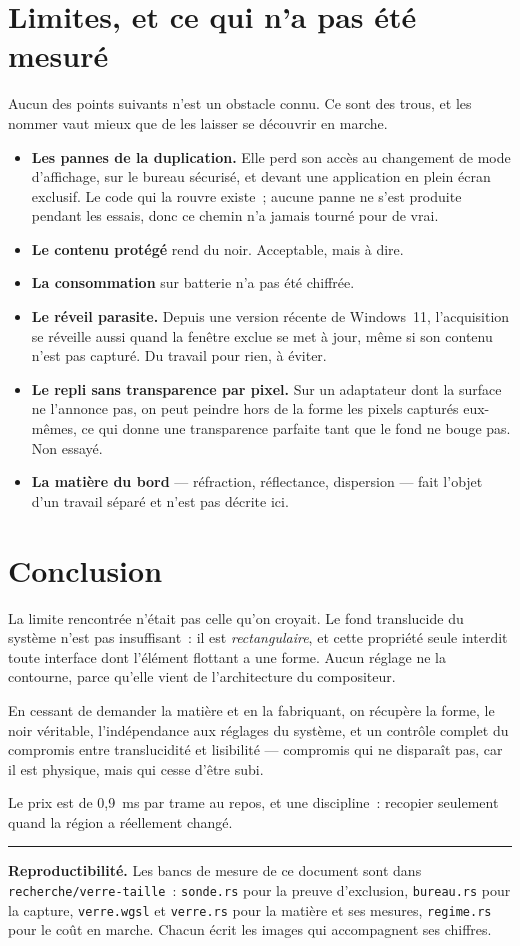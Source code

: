 \documentclass[11pt,a4paper]{article}
\newcommand{\uni}[1]{\texttt{#1}}
\newcommand{\np}[1]{#1}
\begin{document}
\section{Limites, et ce qui n'a pas été mesuré}
\label{sec:limites}

Aucun des points suivants n'est un obstacle connu. Ce sont des trous, et les
nommer vaut mieux que de les laisser se découvrir en marche.

\begin{itemize}
\item \textbf{Les pannes de la duplication.} Elle perd son accès au changement
de mode d'affichage, sur le bureau sécurisé, et devant une application en
plein écran exclusif. Le code qui la rouvre existe~; aucune panne ne s'est
produite pendant les essais, donc ce chemin n'a jamais tourné pour de vrai.
\item \textbf{Le contenu protégé} rend du noir. Acceptable, mais à dire.
\item \textbf{La consommation} sur batterie n'a pas été chiffrée.
\item \textbf{Le réveil parasite.} Depuis une version récente de Windows~11,
l'acquisition se réveille aussi quand la fenêtre exclue se met à jour, même si
son contenu n'est pas capturé. Du travail pour rien, à éviter.
\item \textbf{Le repli sans transparence par pixel.} Sur un adaptateur dont la
surface ne l'annonce pas, on peut peindre hors de la forme les pixels capturés
eux-mêmes, ce qui donne une transparence parfaite tant que le fond ne bouge
pas. Non essayé.
\item \textbf{La matière du bord} — réfraction, réflectance, dispersion — fait
l'objet d'un travail séparé et n'est pas décrite ici.
\end{itemize}

\section{Conclusion}

La limite rencontrée n'était pas celle qu'on croyait. Le fond translucide du
système n'est pas insuffisant~: il est \emph{rectangulaire}, et cette propriété
seule interdit toute interface dont l'élément flottant a une forme. Aucun
réglage ne la contourne, parce qu'elle vient de l'architecture du compositeur.

En cessant de demander la matière et en la fabriquant, on récupère la forme,
le noir véritable, l'indépendance aux réglages du système, et un contrôle
complet du compromis entre translucidité et lisibilité — compromis qui ne
disparaît pas, car il est physique, mais qui cesse d'être subi.

Le prix est de \np{0,9}~ms par trame au repos, et une discipline~: recopier
seulement quand la région a réellement changé.

\bigskip
\hrule
\medskip
\small
\textbf{Reproductibilité.} Les bancs de mesure de ce document sont dans
\uni{recherche/verre-taille}~: \uni{sonde.rs} pour la preuve d'exclusion,
\uni{bureau.rs} pour la capture, \uni{verre.wgsl} et \uni{verre.rs} pour la
matière et ses mesures, \uni{regime.rs} pour le coût en marche. Chacun écrit
les images qui accompagnent ses chiffres.
\end{document}
